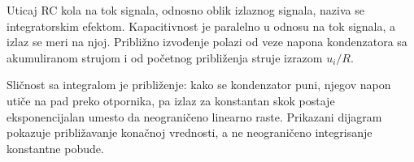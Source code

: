 Uticaj RC kola na tok signala, odnosno oblik izlaznog signala, naziva se integratorskim efektom. Kapacitivnost je paralelno u odnosu na tok signala, a izlaz se meri na njoj. Približno izvođenje polazi od veze napona kondenzatora sa akumuliranom strujom i od početnog približenja struje izrazom $u_i/R$.

Sličnost sa integralom je približenje: kako se kondenzator puni, njegov napon utiče na pad preko otpornika, pa izlaz za konstantan skok postaje eksponencijalan umesto da neograničeno linearno raste. Prikazani dijagram pokazuje približavanje konačnoj vrednosti, a ne neograničeno integrisanje konstantne pobude.
